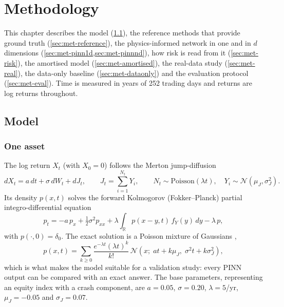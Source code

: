 \chapter{Methodology}
\label{ch:methodology}

This chapter describes the model (\cref{sec:met-model}), the reference methods that provide ground truth
(\cref{sec:met-reference}), the physics-informed network in one and in $d$ dimensions
(\cref{sec:met-pinn1d,sec:met-pinnnd}), how risk is read from it (\cref{sec:met-risk}), the amortised
model (\cref{sec:met-amortised}), the real-data study (\cref{sec:met-real}), the data-only baseline
(\cref{sec:met-dataonly}) and the evaluation protocol (\cref{sec:met-eval}). Time is measured in years of
252 trading days and returns are log returns throughout.

\section{Model}
\label{sec:met-model}

\subsection{One asset}
The log return $X_t$ (with $X_0 = 0$) follows the Merton jump-diffusion
\begin{equation}
  dX_t = a\,dt + \sigma\,dW_t + dJ_t, \qquad J_t = \sum_{i=1}^{N_t} Y_i, \qquad
  N_t \sim \mathrm{Poisson}(\lambda t), \quad Y_i \sim \mathcal{N}(\mu_J, \sigma_J^2).
  \label{eq:merton}
\end{equation}
Its density $p(x,t)$ solves the forward Kolmogorov (Fokker--Planck) partial integro-differential equation
\begin{equation}
  p_t = -a\,p_x + \tfrac12 \sigma^2 p_{xx} + \lambda \int_{\mathbb{R}} p(x - y, t)\, f_Y(y)\,dy - \lambda\, p,
  \label{eq:pide1d}
\end{equation}
with $p(\cdot, 0) = \delta_0$. The exact solution is a Poisson mixture of Gaussians \citep{merton1976},
\begin{equation}
  p(x,t) = \sum_{k \ge 0} \frac{e^{-\lambda t}(\lambda t)^k}{k!}\,
           \mathcal{N}\!\left(x;\; a t + k\mu_J,\; \sigma^2 t + k\sigma_J^2\right),
  \label{eq:exact1d}
\end{equation}
which is what makes the model suitable for a validation study: every PINN output can be compared with an
exact answer. The base parameters, representing an equity index with a crash component, are $a = 0.05$,
$\sigma = 0.20$, $\lambda = 5$/yr, $\mu_J = -0.05$ and $\sigma_J = 0.07$.


